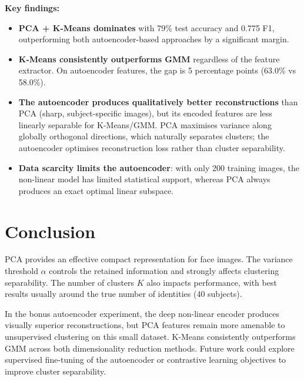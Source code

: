 \documentclass[11pt,a4paper]{article}
\begin{document}
\noindent
\textbf{Key findings:}
\begin{itemize}
    \item \textbf{PCA + K-Means dominates} with 79\% test accuracy and 0.775 F1, outperforming
          both autoencoder-based approaches by a significant margin.
    \item \textbf{K-Means consistently outperforms GMM} regardless of the feature extractor.
          On autoencoder features, the gap is 5 percentage points (63.0\% vs 58.0\%).
    \item \textbf{The autoencoder produces qualitatively better reconstructions} than PCA
          (sharp, subject-specific images), but its encoded features are less linearly separable
          for K-Means/GMM. PCA maximises variance along globally orthogonal directions,
          which naturally separates clusters; the autoencoder optimises reconstruction loss
          rather than cluster separability.
    \item \textbf{Data scarcity limits the autoencoder}: with only 200 training images,
          the non-linear model has limited statistical support, whereas PCA always produces
          an exact optimal linear subspace.
\end{itemize}

\section{Conclusion}

PCA provides an effective compact representation for face images. The variance threshold
$\alpha$ controls the retained information and strongly affects clustering separability.
The number of clusters $K$ also impacts performance, with best results usually around the
true number of identities (40 subjects).

In the bonus autoencoder experiment, the deep non-linear encoder produces visually
superior reconstructions, but PCA features remain more amenable to unsupervised clustering
on this small dataset. K-Means consistently outperforms GMM across both dimensionality
reduction methods. Future work could explore supervised fine-tuning of the autoencoder
or contrastive learning objectives to improve cluster separability.
\end{document}
